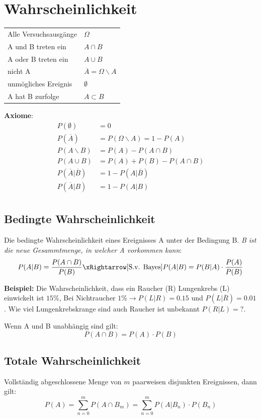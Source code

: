 \section{Wahrscheinlichkeit}
\begin{table}[H]
	\centering
	\begin{tabular}{l|l}
		Alle Versuchsausgänge & $\Omega$ \\
		A und B treten ein & $A \cap B$ \\
		A oder B treten ein & $A \cup B$ \\
		nicht A & $\overline{A} = \Omega \backslash A$ \\
		unmögliches Ereignis & $\emptyset$ \\
		A hat B zurfolge & $A \subset B$ \\
	\end{tabular}
\end{table}

\textbf{Axiome}:\\
\begin{align*}
	P(\emptyset) &= 0 \\
	P(\overline{A}) &= P(\Omega \backslash A) = 1 - P(A) \\
	P(A \backslash B) &= P(A) - P(A \cap B) \\
	P(A \cup B) &= P(A)  + P(B) - P(A \cap B) \\
	P(\overline{A} | \overline{B}) &= 1-P(A|\overline{B}) \\
	P(\overline{A} | B) &= 1-P(A|B) \\
\end{align*}

\subsection{Bedingte Wahrscheinlichkeit}
Die bedingte Wahrscheinlichkeit eines Ereignisses A unter der Bedingung B. \textit{B ist die neue Gesammtmenge, in welcher A vorkommen kann}:
\[
P(A|B) = \frac{P(A \cap B)}{P(B)} \xRightarrow[\text{S.v. Bayes}]{} P(A|B) = P(B|A)\cdot\frac{P(A)}{P(B)}
\]

\noindent\textbf{Beispiel:} Die Wahrscheinlichkeit, dass ein Raucher (R) Lungenkrebs (L) einwickelt ist $15\%$, Bei Nichtraucher $1\% \rightarrow P(L|R) = 0.15$ und $P(L|\overline{R}) = 0.01$. Wie viel Lungenkrebskrange sind auch Raucher ist unbekannt $P(R|L) = ?$.

\noindent Wenn A und B unabhängig sind gilt:
\[ P(A \cap B) = P(A) \cdot P(B)\]


\subsection{Totale Wahrscheinlichkeit}
Vollständig abgeschlossene Menge von $m$ paarweisen disjunkten Ereignissen, dann gilt:
\[
P(A) = \sum_{n=0}^{m}P(A\cap B_m) = \sum_{n=0}^{m}P(A|B_n)\cdot P(B_n)
\]

